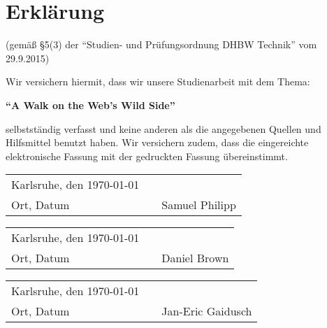 \chapter*{Erklärung}

\vspace*{2em}

(gemäß §5(3) der \enquote{Studien- und Prüfungsordnung DHBW Technik} vom 29.9.2015)

Wir versichern hiermit, dass wir unsere Studienarbeit mit dem Thema:

\textbf{\enquote{A Walk on the Web's Wild Side}}

selbstständig verfasst und keine anderen als die angegebenen Quellen und Hilfsmittel benutzt haben. Wir versichern zudem, dass die eingereichte elektronische Fassung mit der gedruckten Fassung übereinstimmt.

\vspace{3em}

\begin{tabular}{lp{2em}l}
 Karlsruhe, den \today  && \hspace{7cm} \\\cline{1-1}\cline{3-3}
 Ort, Datum     &&  Samuel Philipp
\end{tabular}

\vspace{3em}

\begin{tabular}{lp{2em}l}
 Karlsruhe, den \today  && \hspace{7cm} \\\cline{1-1}\cline{3-3}
 Ort, Datum     &&  Daniel Brown
\end{tabular}

\vspace{3em}

\begin{tabular}{lp{2em}l}
 Karlsruhe, den \today  && \hspace{7cm} \\\cline{1-1}\cline{3-3}
 Ort, Datum     &&  Jan-Eric Gaidusch
\end{tabular}
